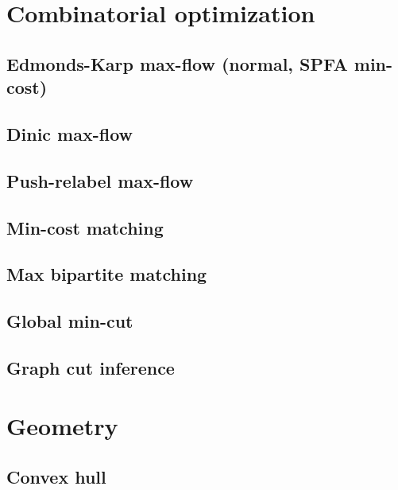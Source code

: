 \section{Combinatorial optimization}
\subsection{Edmonds-Karp max-flow (normal, SPFA min-cost)}
\raggedbottom
\hrulefill
\subsection{Dinic max-flow}
\raggedbottom
\hrulefill
\subsection{Push-relabel max-flow}
\raggedbottom
\hrulefill
\subsection{Min-cost matching}
\raggedbottom
\hrulefill
\subsection{Max bipartite matching}
\raggedbottom
\hrulefill
\subsection{Global min-cut}
\raggedbottom
\hrulefill
\subsection{Graph cut inference}
\raggedbottom
\hrulefill

\section{Geometry}
\subsection{Convex hull}
\raggedbottom
\hrulefill
